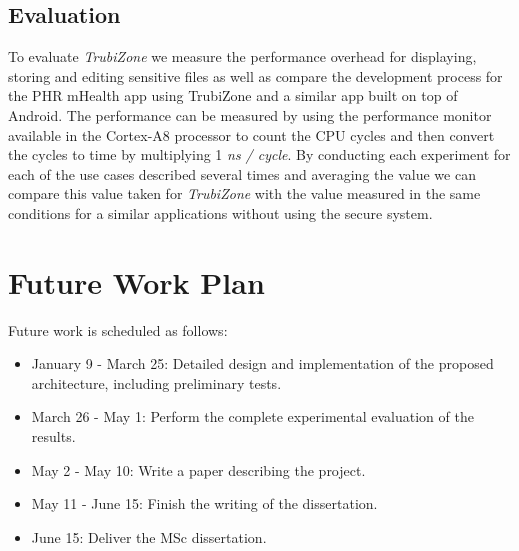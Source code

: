 
\subsection{Evaluation}


To evaluate \emph{TrubiZone} we measure the performance overhead for displaying, storing and editing sensitive files as well as compare the development process for the PHR mHealth app using TrubiZone and a similar app built on top of Android. The performance can be measured by using the performance monitor available in the Cortex-A8 processor to count the CPU cycles and then convert the cycles to time by multiplying 1 \emph{ns / cycle}. By conducting each experiment for each of the use cases described several times and averaging the value we can compare this value taken for \emph{TrubiZone} with the value measured in the same conditions for a similar applications without using the secure system.



\section{Future Work Plan}
\label{sec:workplan}

Future work is scheduled as follows:

\begin{itemize}
	\item January 9 - March 25: Detailed design and implementation of the
	proposed architecture, including preliminary tests.
	\item March 26 - May 1: Perform the complete experimental evaluation
	of the results.
	\item May 2 - May 10: Write a paper describing the project.
	\item May 11 - June 15: Finish the writing of the dissertation.
	\item June 15: Deliver the MSc dissertation.
\end{itemize}

